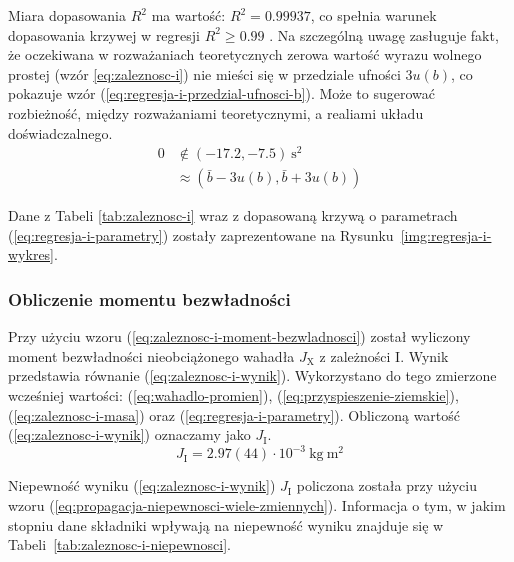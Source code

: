 \documentclass[twocolumn, a4paper, polish, 10pt]{article}
\newcommand{\JX}{\ensuremath{ J_{\mathrm{X}} }}
\newcommand{\JXn}[1]{\ensuremath{ J_{\mathrm{#1}} }}
\begin{document}
Miara dopasowania $R^2$ ma wartość: $R^2 = 0.99937$, co spełnia warunek dopasowania krzywej w regresji $R^2 \geq 0.99$ \cite{epa-8000d}.
Na szczególną uwagę zasługuje fakt, że oczekiwana w rozważaniach teoretycznych zerowa wartość wyrazu wolnego prostej (wzór \ref{eq:zaleznosc-i}) nie mieści się w przedziale ufności $3 u(b)$, co pokazuje wzór (\ref{eq:regresja-i-przedzial-ufnosci-b}).
Może to sugerować rozbieżność, między rozważaniami teoretycznymi, a realiami układu doświadczalnego.
\begin{equation}
\begin{split}
    0 &\notin \left( -17.2, -7.5 \right)~\mathrm{s^2} \\
    &\approx \left( \bar{b} - 3 u(b), \bar{b} + 3 u(b) \right)
    \label{eq:regresja-i-przedzial-ufnosci-b}
\end{split}
\end{equation}

Dane z Tabeli \ref{tab:zaleznosc-i} wraz z dopasowaną krzywą o parametrach (\ref{eq:regresja-i-parametry}) zostały zaprezentowane na Rysunku~\ref{img:regresja-i-wykres}.


\subsubsection{Obliczenie momentu bezwładności}
Przy użyciu wzoru (\ref{eq:zaleznosc-i-moment-bezwladnosci}) został wyliczony moment bezwładności nieobciążonego wahadła $\JX$ z zależności I. Wynik przedstawia równanie (\ref{eq:zaleznosc-i-wynik}).
Wykorzystano do tego zmierzone wcześniej wartości: (\ref{eq:wahadlo-promien}), (\ref{eq:przyspieszenie-ziemskie}), (\ref{eq:zaleznosc-i-masa}) oraz (\ref{eq:regresja-i-parametry}). Obliczoną wartość (\ref{eq:zaleznosc-i-wynik}) oznaczamy jako $\JXn{I}$.
\begin{equation}
    \JXn{I} = 2.97(44) \cdot 10^{-3}~\mathrm{kg~m^2}
    \label{eq:zaleznosc-i-wynik}
\end{equation}

Niepewność wyniku (\ref{eq:zaleznosc-i-wynik}) $\JXn{I}$ policzona została przy użyciu wzoru (\ref{eq:propagacja-niepewnosci-wiele-zmiennych}).
Informacja o tym, w jakim stopniu dane składniki wpływają na niepewność wyniku znajduje się w Tabeli~\ref{tab:zaleznosc-i-niepewnosci}.
\end{document}
